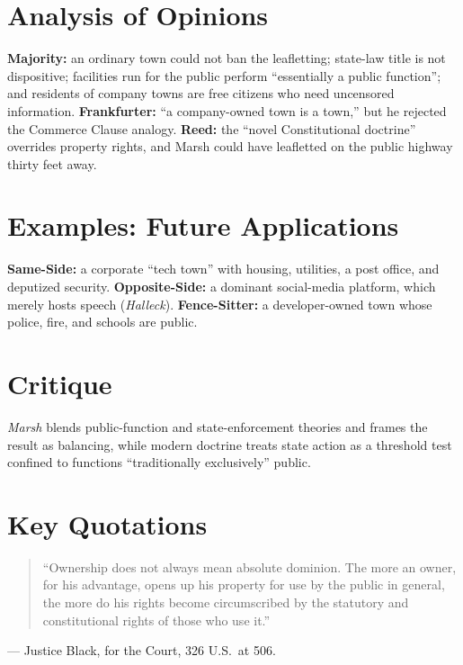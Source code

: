 \documentclass[12pt]{article}
\begin{document}
\section{Analysis of Opinions}
\textbf{Majority:} an ordinary town could not ban the leafletting; state-law title is not dispositive; facilities run for the public perform ``essentially a public function''; and residents of company towns are free citizens who need uncensored information. \textbf{Frankfurter:} ``a company-owned town is a town,'' but he rejected the Commerce Clause analogy. \textbf{Reed:} the ``novel Constitutional doctrine'' overrides property rights, and Marsh could have leafletted on the public highway thirty feet away.

\section{Examples: Future Applications}
\textbf{Same-Side:} a corporate ``tech town'' with housing, utilities, a post office, and deputized security. \textbf{Opposite-Side:} a dominant social-media platform, which merely hosts speech (\textit{Halleck}). \textbf{Fence-Sitter:} a developer-owned town whose police, fire, and schools are public.

\section{Critique}
\textit{Marsh} blends public-function and state-enforcement theories and frames the result as balancing, while modern doctrine treats state action as a threshold test confined to functions ``traditionally exclusively'' public.

\section{Key Quotations}
\begin{quote}
``Ownership does not always mean absolute dominion. The more an owner, for his advantage, opens up his property for use by the public in general, the more do his rights become circumscribed by the statutory and constitutional rights of those who use it.''
\end{quote}
\noindent --- Justice Black, for the Court, 326 U.S.\ at 506.
\end{document}
